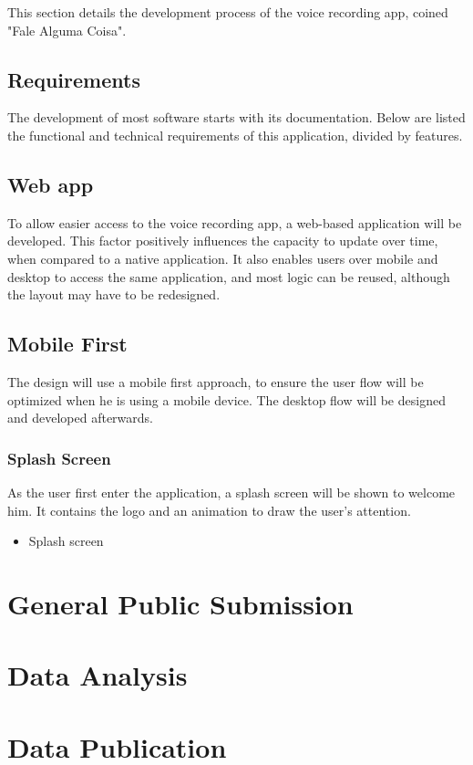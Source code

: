 This section details the development process of the voice recording app, coined "Fale Alguma Coisa".

\subsection{Requirements}

The development of most software starts with its documentation. Below are listed the functional and technical requirements of this application, divided by features.

\subsection{Web app}

To allow easier access to the voice recording app, a web-based application will be developed. This factor positively influences the capacity to update over time, when compared to a native application. It also enables users over mobile and desktop to access the same application, and most logic can be reused, although the layout may have to be redesigned.

\subsection{Mobile First}

The design will use a mobile first approach, to ensure the user flow will be optimized when he is using a mobile device. The desktop flow will be designed and developed afterwards.

\subsubsection{Splash Screen}

As the user first enter the application, a splash screen will be shown to welcome him. It contains the logo and an animation to draw the user's attention.

\begin{itemize}
    \item Splash screen
\end{itemize}

\section{General Public Submission}

\section{Data Analysis}

\section{Data Publication}